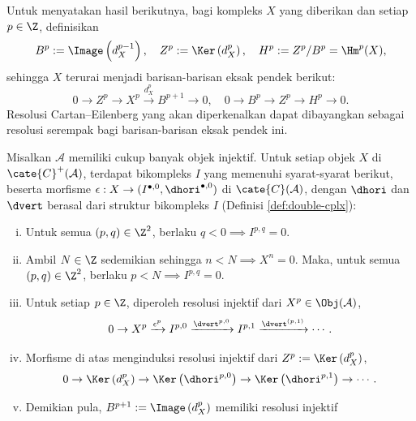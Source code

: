 Untuk menyatakan hasil berikutnya, bagi kompleks $X$ yang diberikan dan setiap $p \in \Z$, definisikan
\[ B^p := \Image\left( d_X^{p-1} \right), \quad Z^p := \Ker\left( d_X^p \right), \quad H^p := Z^p/B^p = \Hm^p(X) , \]
sehingga $X$ terurai menjadi barisan-barisan eksak pendek berikut:
\[ 0 \to Z^p \to X^p \xrightarrow{d_X^p} B^{p+1} \to 0, \quad 0 \to B^p \to Z^p \to H^p \to 0. \]
Resolusi Cartan--Eilenberg yang akan diperkenalkan dapat dibayangkan sebagai resolusi serempak bagi barisan-barisan eksak pendek ini.

\begin{teorema}\label{prop:CE-resolution}
	Misalkan $\mathcal{A}$ memiliki cukup banyak objek injektif. Untuk setiap objek $X$ di $\cate{C}^+(\mathcal{A})$, terdapat bikompleks $I$ yang memenuhi syarat-syarat berikut, beserta morfisme $\epsilon: X \to (I^{\bullet, 0}, \dhori^{\bullet, 0})$ di $\cate{C}(\mathcal{A})$, dengan $\dhori$ dan $\dvert$ berasal dari struktur bikompleks $I$ (Definisi \ref{def:double-cplx}):
	\begin{enumerate}[(i)]
		\item Untuk semua $(p, q) \in \Z^2$, berlaku $q < 0 \implies I^{p, q} = 0$.
		\item Ambil $N \in \Z$ sedemikian sehingga $n < N \implies X^n = 0$. Maka, untuk semua $(p, q) \in \Z^2$, berlaku $p < N \implies I^{p, q} = 0$.
		\item Untuk setiap $p \in \Z$, diperoleh resolusi injektif dari $X^p \in \Obj(\mathcal{A})$,
		\[ 0 \to X^p \xrightarrow{\epsilon^p} I^{p, 0} \xrightarrow{\dvert^{p, 0}} I^{p, 1} \xrightarrow{\dvert^{(p, 1)}} \cdots . \]
		\item Morfisme di atas menginduksi resolusi injektif dari $Z^p := \Ker\left( d_X^p \right)$,
		\[ 0 \to \Ker\left( d_X^p \right) \to \Ker\left( \dhori^{p, 0} \right) \to \Ker\left( \dhori^{p, 1} \right) \to \cdots . \]
		\item Demikian pula, $B^{p+1} := \Image\left( d_X^p \right)$ memiliki resolusi injektif

\end{enumerate}
\end{teorema}
